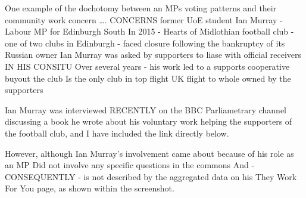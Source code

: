 One example of the dochotomy between an MPs voting patterns and their community work concern …. 
CONCERNS former UoE student Ian Murray - Labour MP for Edinburgh South
In 2015 - Hearts of Midlothian football club - one of two clubs in Edinburgh - faced closure following the bankruptcy of its Russian owner
Ian Murray was asked by supporters to liase with official receivers IN HIS CONSITU
Over several years - his work led to a supports cooperative buyout the club
Is the only club in top flight UK flight to whole owned by the supporters

Ian Murray was interviewed RECENTLY on the BBC Parliametrary channel discussing a book he wrote about his voluntary work helping the supporters of the football club,
and I have included the link directly below.

However, although Ian Murray’s involvement came about because of his role as an MP
Did not involve any specific questions in the commons
And - CONSEQUENTLY - is not described by the aggregated data on his They Work For You page, as shown within the screenshot.